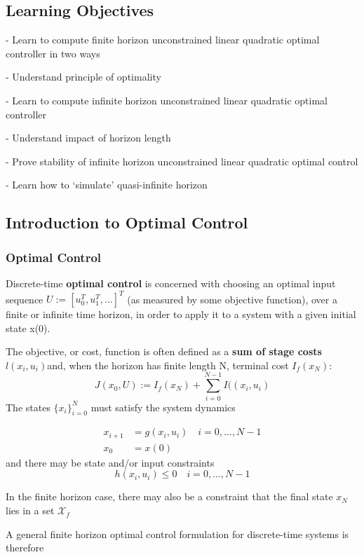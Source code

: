 \subsection{Learning Objectives}

- Learn to compute finite horizon
unconstrained linear quadratic optimal controller in two ways

- Understand principle of optimality

- Learn to compute infinite horizon
unconstrained linear quadratic optimal controller

- Understand impact of horizon length

- Prove stability of infinite horizon
unconstrained linear quadratic optimal control

- Learn how to ‘simulate’ quasi-infinite horizon

\subsection{Introduction to Optimal Control}

\subsubsection{Optimal Control}
Discrete-time \textbf{optimal control} is concerned with
choosing an optimal input sequence
$U := [u_0^T, u_1^T,...]^T$ %
(as measured by some objective function),
over a finite or infinite time horizon,
in order to apply it to a system with a given initial state x(0).

The objective, or cost, function is often defined as a
\textbf{sum of stage costs} $l(x_i,u_i)$and,
when the horizon has finite length N,
terminal cost $I_f(x_N)$:
$$
	J(x_0,U) :=  I_f(x_N) +
	\sum_{i=0}^{N-1}I((x_i,u_i)
$$
The states $\{x_i\}_{i=0}^N$ must satisfy the system dynamics

$$\begin{aligned}
		x_{i+1} & = g(x_i,u_i )
		\quad i = 0,\dots,N-1   \\
		x_0     & = x(0)
	\end{aligned}$$
and there may be state and/or input constraints
$$
	h(x_i,u_i)\le 0
	\quad i = 0,\dots,N-1
$$

In the finite horizon case,
there may also be a constraint that
the final state $x_N$ lies in a set $\mathcal{X}_f$

A general finite horizon optimal control formulation
for discrete-time systems is therefore

